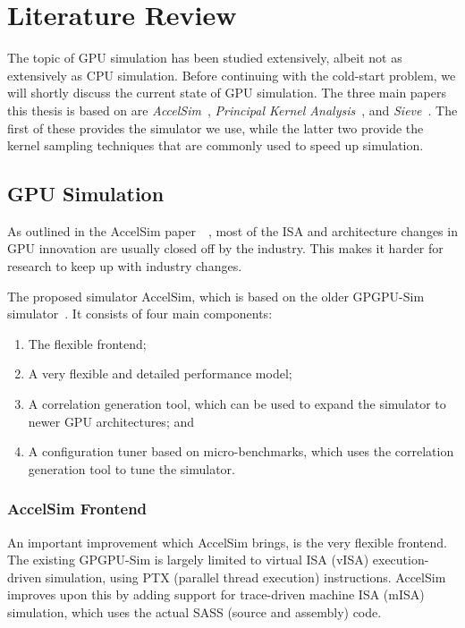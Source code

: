 \chapter{Literature Review}\label{ch:literature-review}
The topic of GPU simulation has been studied extensively, albeit not as extensively as CPU simulation.
Before continuing with the cold-start problem, we will shortly discuss the current state of GPU simulation.
The three main papers this thesis is based on are \textit{AccelSim}~\cite{accelsim}, \textit{Principal Kernel Analysis}~\cite{pks}, and \textit{Sieve}~\cite{sieve}.
The first of these provides the simulator we use, while the latter two provide the kernel sampling techniques that are commonly used to speed up simulation.

\section{GPU Simulation}\label{sec:gpu-simulation}
As outlined in the AccelSim paper\ ~\cite{accelsim}, most of the ISA and architecture changes in GPU innovation are usually closed off by the industry.
This makes it harder for research to keep up with industry changes.

The proposed simulator AccelSim, which is based on the older GPGPU-Sim simulator~\cite{gpgpu-sim}.
It consists of four main components:
\begin{enumerate}
    \item The flexible frontend;
    \item A very flexible and detailed performance model;
    \item A correlation generation tool, which can be used to expand the simulator to newer GPU architectures; and
    \item A configuration tuner based on micro-benchmarks, which uses the correlation generation tool to tune the simulator.
\end{enumerate}


\subsection{AccelSim Frontend}\label{subsec:accelsim-frontend}
An important improvement which AccelSim brings, is the very flexible frontend.
The existing GPGPU-Sim is largely limited to virtual ISA (vISA) execution-driven simulation, using PTX (parallel thread execution) instructions.
AccelSim improves upon this by adding support for trace-driven machine ISA (mISA) simulation, which uses the actual SASS (source and assembly) code.

